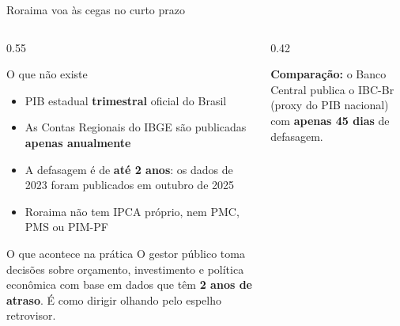 \documentclass[aspectratio=169, 11pt]{beamer}
\begin{document}
\begin{frame}{Roraima voa às cegas no curto prazo}

  \begin{columns}[T]
    \begin{column}{0.55\textwidth}
      \begin{alertblock}{O que não existe}
        \begin{itemize}
          \item PIB estadual \textbf{trimestral} oficial do Brasil
          \item As Contas Regionais do IBGE são publicadas \textbf{apenas anualmente}
          \item A defasagem é de \textbf{até 2 anos}: os dados de 2023 foram
                publicados em outubro de 2025
          \item Roraima não tem IPCA próprio, nem PMC, PMS ou PIM-PF
        \end{itemize}
      \end{alertblock}

      \vspace{0.3cm}

      \begin{exampleblock}{O que acontece na prática}
        O gestor público toma decisões sobre orçamento, investimento e política
        econômica com base em dados que têm \textbf{2 anos de atraso}.
        É como dirigir olhando pelo espelho retrovisor.
      \end{exampleblock}
    \end{column}

    \begin{column}{0.42\textwidth}

      \vspace{0.4cm}
      \small\color{seplanblue}
      \textbf{Comparação:} o Banco Central publica o IBC-Br (proxy do PIB nacional)
      com \textbf{apenas 45 dias} de defasagem.
    \end{column}
  \end{columns}
\end{frame}
\end{document}

